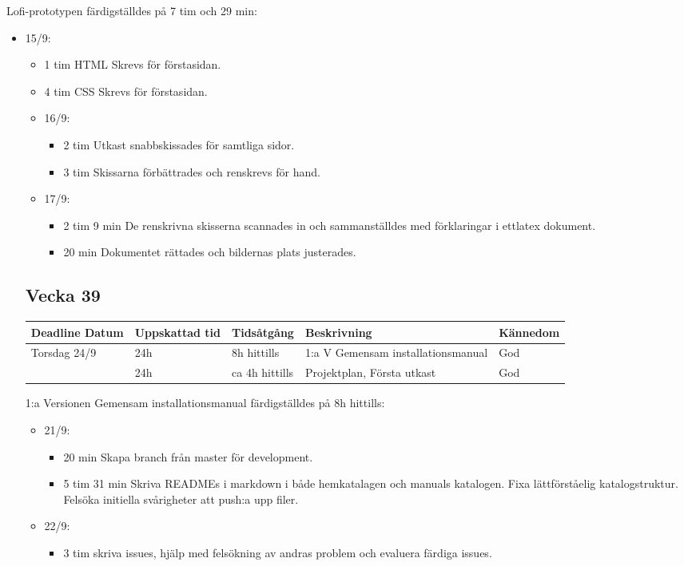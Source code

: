 \documentclass{TDP003mall}
\begin{document}
Lofi-prototypen färdigställdes på 7 tim och 29 min:
\begin{itemize}
	\item 15/9:
	\begin{itemize}
		\item 1 tim HTML Skrevs för förstasidan.
		\item 4 tim CSS Skrevs för förstasidan.
	\item 16/9:
	\begin{itemize}
		\item 2 tim Utkast snabbskissades för samtliga sidor.
		\item 3 tim Skissarna förbättrades och renskrevs för hand.
	\end{itemize}
	\item 17/9:
	\begin{itemize}
		\item 2 tim 9 min De renskrivna skisserna scannades in och sammanställdes med förklaringar i ettlatex dokument.
		\item 20 min Dokumentet rättades och bildernas plats justerades.\\
	\end{itemize}
\end{itemize}


\subsection{Vecka 39}
\begin{tabularx}{\linewidth}{|l|l|l|X|l|}
	\hline
	Deadline Datum & Uppskattad tid & Tidsåtgång     & Beskrivning                        & Kännedom \\ 
	\hline
	Torsdag 24/9   & 24h            & 8h hittills    & 1:a V Gemensam installationsmanual & God      \\
	\hline
                   & 24h            & ca 4h hittills & Projektplan, Första utkast         & God      \\
	\hline
\end{tabularx}{\linewidth}

1:a Versionen Gemensam installationsmanual färdigställdes på 8h hittills:
\begin{itemize}
	\item 21/9:
	\begin{itemize}
		\item 20 min Skapa branch från master för development.
		\item 5 tim 31 min Skriva READMEs i markdown i både hemkatalagen och manuals katalogen. Fixa lättförståelig katalogstruktur. Felsöka initiella svårigheter att push:a upp filer.
	\end{itemize}
	\item 22/9:
	\begin{itemize}
		\item 3 tim skriva issues, hjälp med felsökning av andras problem och evaluera färdiga issues.\\
	\end{itemize}
\end{itemize}


\end{itemize}
\end{document}
